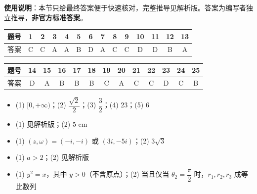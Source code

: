 
\begin{gknotice}
\textbf{使用说明}：本节只给最终答案便于快速核对，完整推导见解析版。答案为编写者独立推导，\textbf{非官方标准答案}。
\end{gknotice}

\begin{center}\begin{tabular}{cccccccccccccc}
\toprule
题号 & 1 & 2 & 3 & 4 & 5 & 6 & 7 & 8 & 9 & 10 & 11 & 12 & 13 \\
\midrule
答案 & C & C & A & A & B & D & A & C & C & D & D & B & A \\
\bottomrule
\end{tabular}\end{center}\medskip
\begin{center}\begin{tabular}{ccccccccccccc}
\toprule
题号 & 14 & 15 & 16 & 17 & 18 & 19 & 20 & 21 & 22 & 23 & 24 & 25 \\
\midrule
答案 & D & A & B & B & B & C & A & C & C & D & C & B \\
\bottomrule
\end{tabular}\end{center}

\begin{itemize}[leftmargin=2.6em]
  \item[\textbf{一.}] (1) $[0,+\infty)$；(2) $\dfrac{\sqrt2}{2}$；(3) $\dfrac32$；(4) $23$；(5) $6$
\end{itemize}

\begin{itemize}[leftmargin=2.6em]
  \item[\textbf{二.}] (1) 见解析版；(2) $5\text{ cm}$
  \item[\textbf{三.}] (1) $(z,\omega)=(-i,-i)$ 或 $(3i,-5i)$；(2) $3\sqrt3$
  \item[\textbf{四.}] (1) $a>2$；(2) 见解析版
  \item[\textbf{五.}] (1) $y^2=x$，其中 $y>0$（不含原点）；(2) 当且仅当 $\theta_2=\dfrac\pi2$ 时，$r_1,r_2,r_3$ 成等比数列
\end{itemize}
